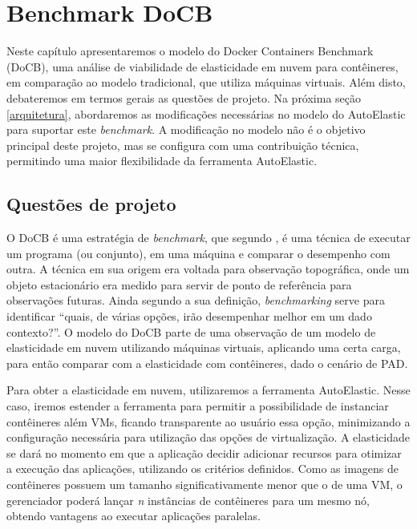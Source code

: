 \documentclass[twoside,english,brazilian]{UNISINOSartigo}
\begin{document}
\section{Benchmark DoCB}
\label{model}

Neste capítulo apresentaremos o modelo do Docker Containers Benchmark (DoCB), uma análise de viabilidade de elasticidade em nuvem para contêineres, em comparação ao modelo tradicional, que utiliza máquinas virtuais. Além disto, debateremos em termos gerais as questões de projeto. Na próxima seção \ref{arquitetura}, abordaremos as modificações necessárias no modelo do AutoElastic para suportar este \textit{benchmark}. A modificação no modelo não é o objetivo principal deste projeto, mas se configura com uma contribuição técnica, permitindo uma maior flexibilidade da ferramenta AutoElastic. 

\subsection{Questões de projeto}
\label{questao}

O DoCB é uma estratégia de \textit{benchmark}, que segundo , é uma técnica de executar um programa (ou conjunto), em uma máquina e comparar o desempenho com outra. A técnica em sua origem era voltada para observação topográfica, onde um objeto estacionário era medido para servir de ponto de referência para observações futuras. Ainda segundo a sua definição, \textit{benchmarking} serve para identificar ``quais, de várias opções, irão desempenhar melhor em um dado contexto?''. O modelo do DoCB parte de uma observação de um modelo de elasticidade em nuvem utilizando máquinas virtuais, aplicando uma certa carga, para então comparar com a elasticidade com contêineres, dado o cenário de PAD.

Para obter a elasticidade em nuvem, utilizaremos a ferramenta AutoElastic. Nesse caso, iremos estender a ferramenta para permitir a possibilidade de instanciar contêineres além VMs, ficando transparente ao usuário essa opção, minimizando a configuração necessária para utilização das opções de virtualização. A elasticidade se dará no momento em que a aplicação decidir adicionar recursos para otimizar a execução das aplicações, utilizando os critérios definidos. Como as imagens de contêineres possuem um tamanho significativamente menor que o de uma VM, o gerenciador poderá lançar \textit{n} instâncias de contêineres para um mesmo nó, obtendo vantagens ao executar aplicações paralelas. 
\end{document}
